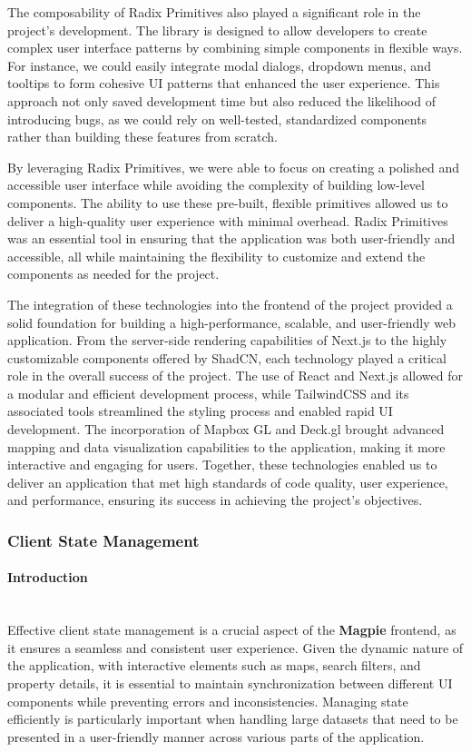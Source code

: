 \begin{enumerate}
    The composability of Radix Primitives also played a significant role in the project's development. The library is designed to allow developers to create complex user interface patterns by combining simple components in flexible ways. For instance, we could easily integrate modal dialogs, dropdown menus, and tooltips to form cohesive UI patterns that enhanced the user experience. This approach not only saved development time but also reduced the likelihood of introducing bugs, as we could rely on well-tested, standardized components rather than building these features from scratch.

    By leveraging Radix Primitives, we were able to focus on creating a polished and accessible user interface while avoiding the complexity of building low-level components. The ability to use these pre-built, flexible primitives allowed us to deliver a high-quality user experience with minimal overhead. Radix Primitives was an essential tool in ensuring that the application was both user-friendly and accessible, all while maintaining the flexibility to customize and extend the components as needed for the project.


\end{enumerate}

The integration of these technologies into the frontend of the project provided a solid foundation for building a high-performance, scalable, and user-friendly web application. From the server-side rendering capabilities of Next.js to the highly customizable components offered by ShadCN, each technology played a critical role in the overall success of the project. The use of React and Next.js allowed for a modular and efficient development process, while TailwindCSS and its associated tools streamlined the styling process and enabled rapid UI development. The incorporation of Mapbox GL and Deck.gl brought advanced mapping and data visualization capabilities to the application, making it more interactive and engaging for users. Together, these technologies enabled us to deliver an application that met high standards of code quality, user experience, and performance, ensuring its success in achieving the project’s objectives.

\subsubsection{Client State Management}
    \paragraph{Introduction}\mbox{}\\
    \newline
    Effective client state management is a crucial aspect of the \textbf{Magpie} frontend, as it ensures a seamless and consistent user experience. Given the dynamic nature of the application, with interactive elements such as maps, search filters, and property details, it is essential to maintain synchronization between different UI components while preventing errors and inconsistencies. Managing state efficiently is particularly important when handling large datasets that need to be presented in a user-friendly manner across various parts of the application.
